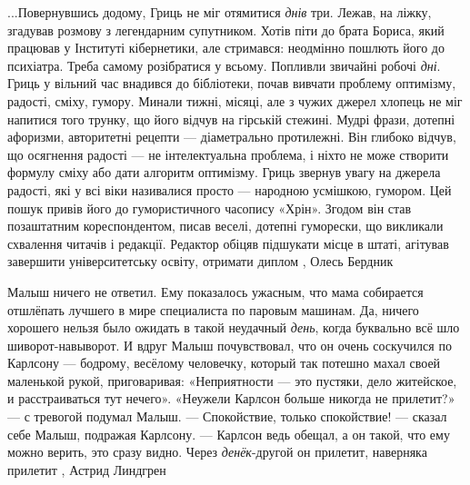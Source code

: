 ...Повернувшись додому, Гриць не міг отямитися \emph{днів} три. Лежав, на
ліжку, згадував розмову з легендарним супутником. Хотів піти до брата Бориса,
який працював у Інституті кібернетики, але стримався: неодмінно пошлють його до
психіатра. Треба самому розібратися у всьому.  Попливли звичайні робочі
\emph{дні}. Гриць у вільний час внадився до бібліотеки, почав вивчати проблему
оптимізму, радості, сміху, гумору. Минали тижні, місяці, але з чужих джерел
хлопець не міг напитися того трунку, що його відчув на гірській стежині. Мудрі
фрази, дотепні афоризми, авторитетні рецепти — діаметрально протилежні. Він
глибоко відчув, що осягнення радості — не інтелектуальна проблема, і ніхто не
може створити формулу сміху або дати алгоритм оптимізму.  Гриць звернув увагу
на джерела радості, які у всі віки називалися просто — народною усмішкою,
гумором. Цей пошук привів його до гумористичного часопису «Хрін». Згодом він
став позаштатним кореспондентом, писав веселі, дотепні гуморески, що викликали
схвалення читачів і редакції. Редактор обіцяв підшукати місце в штаті, агітував
завершити університетську освіту, отримати диплом
, Олесь Бердник

Малыш ничего не ответил. Ему показалось ужасным, что мама собирается отшлёпать
лучшего в мире специалиста по паровым машинам. Да, ничего хорошего нельзя было
ожидать в такой неудачный \emph{день}, когда буквально всё шло
шиворот-навыворот.  И вдруг Малыш почувствовал, что он очень соскучился по
Карлсону — бодрому, весёлому человечку, который так потешно махал своей
маленькой рукой, приговаривая: «Неприятности — это пустяки, дело житейское, и
расстраиваться тут нечего». «Неужели Карлсон больше никогда не прилетит?» — с
тревогой подумал Малыш.  — Спокойствие, только спокойствие! — сказал себе
Малыш, подражая Карлсону. — Карлсон ведь обещал, а он такой, что ему можно
верить, это сразу видно. Через \emph{денёк}-другой он прилетит, наверняка
прилетит
, Астрид Линдгрен

